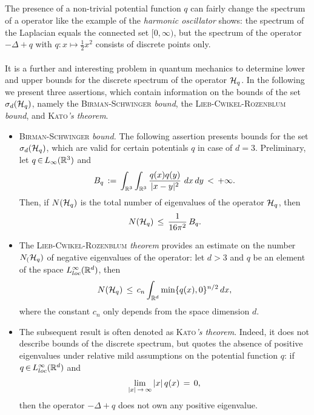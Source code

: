 \documentclass[11pt,twoside]{article}
\begin{document}
\subparagraph*{}
The presence of a non-trivial potential function $q$
can fairly change the spectrum of a {\SCHROEDINGER} operator 
like the example of the \textit{harmonic oscillator} shows:
the spectrum of the Laplacian equals the connected set $[0,\infty)$,
but the spectrum of the operator $-\Delta + q$ 
with $q:x \mapsto \frac{1}{2}x^2$ consists of discrete points only.

\paragraph*{}
It is a further and interesting problem in quantum mechanics
to determine lower and upper bounds for the discrete spectrum of the
operator ${\mathcal{H}}_q$.
In the following we present three assertions,
which contain information on the bounds of the set $\sigma_d({\mathcal{H}}_q)$,
namely
the \textsc{Birman-Schwinger} \textit{bound}, 
the \textsc{Lieb-Cwikel-Rozenblum} \textit{bound}, and
    \textsc{Kato}\textit{'s theorem}.

\begin{itemize}[leftmargin=12pt]
\item[1.]
\textsc{Birman-Schwinger} \textit{bound.}
The following assertion presents bounds for the set $\sigma_d({\mathcal{H}}_q)$,
which are valid for certain potentials $q$ in case of $d=3$.
Preliminary,
let $q {\,\in\,} L_{\infty}({\mathbb{R}}^3)$ and 
\[
B_q \eqdef
\int_{\R^3} \int_{\R^3} \frac{q(x) q(y)}{\abs{x-y} ^2} \ dx \, dy
\, < \, + \infty.
\]
Then,
if $N({\mathcal{H}}_q)$ is the total number of eigenvalues of the operator ${\mathcal{H}}_q$,
then 
\[
N({\mathcal{H}}_q) \, \leq \, \frac{1}{16 \pi^2} \, B_q.
\]

\item[2.]
The \textsc{Lieb-Cwikel-Rozenblum} \textit{theorem}
provides an estimate on the number $N_({\mathcal{H}}_q)$
of negative eigenvalues of the {\SCHROEDINGER} operator:
let $d > 3$ and $q$ be an element of the space $L_{loc}^{\infty}({\mathbb{R}}^d)$,
then
\[
N({\mathcal{H}}_q) \, \leq \, c_n \int_{{\mathbb{R}}^d} \min \{q(x),0\}^{n/2} \, dx,
\]
where the constant $c_n$ only depends from the space dimension $d$.

\item[3.]
The subsequent result is often denoted as \textsc{Kato}\textit{'s theorem}.
Indeed, 
it does not describe bounds of the discrete spectrum,
but quotes the absence of positive eigenvalues under relative mild
assumptions on the potential function $q$:
if $q {\,\in\,} L_{loc}^{\infty}({\mathbb{R}}^d)$ and
\[
\lim_{\abs{x} \xto \infty} \, \abs{x} \, q(x) \= 0,
\]
then the operator $-\Delta+q$ does not own any positive eigenvalue.
\end{itemize}
\end{document}
